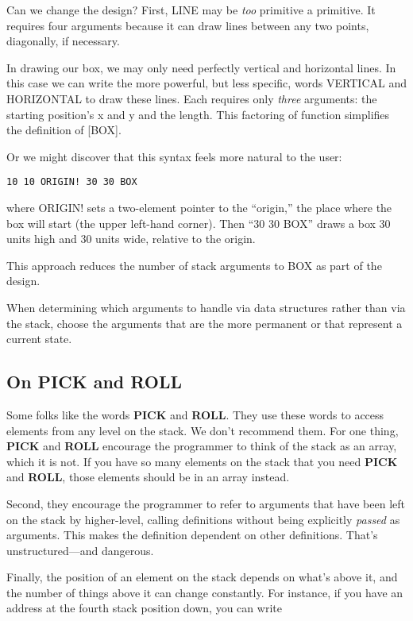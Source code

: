 Can we change the design? First, LINE may be \emph{too} primitive a
primitive. It requires four arguments because it can draw lines between
any two points, diagonally, if necessary.

In drawing our box, we may only need perfectly vertical and horizontal
lines. In this case we can write the more powerful, but less specific,
words VERTICAL and HORIZONTAL to draw these lines. Each requires
only \emph{three} arguments: the starting position's x and y and the
length. This factoring of function simplifies the definition of [BOX].

Or we might discover that this syntax feels more natural to the
user:

\begin{verbatim}
10 10 ORIGIN! 30 30 BOX
\end{verbatim}

where ORIGIN! sets a two-element pointer to the ``origin,'' the place
where the box will start (the upper left-hand corner). Then ``30 30 BOX''
draws a box 30 units high and 30 units wide, relative to the origin.

This approach reduces the number of stack arguments to BOX as
part of the design.

\begin{tip}
When determining which arguments to handle via data structures rather
than via the stack, choose the arguments that are the more permanent or
that represent a current state.
\end{tip}
\subsection{On PICK and ROLL}

Some folks like the words \textbf{PICK} and \textbf{ROLL}. They use these words to
access elements from any level on the stack. We don't recommend them.
For one thing, \textbf{PICK} and \textbf{ROLL} encourage the programmer to think
of the stack as an array, which it is not. If you have so many elements on
the stack that you need \textbf{PICK} and \textbf{ROLL}, those elements should be in
an array instead.

Second, they encourage the programmer to refer to arguments that
have been left on the stack by higher-level, calling definitions without
being explicitly \emph{passed} as arguments. This makes the definition
dependent on other definitions. That's unstructured---and dangerous.

Finally, the position of an element on the stack depends on what's
above it, and the number of things above it can change constantly. For
instance, if you have an address at the fourth stack position down, you can
write

